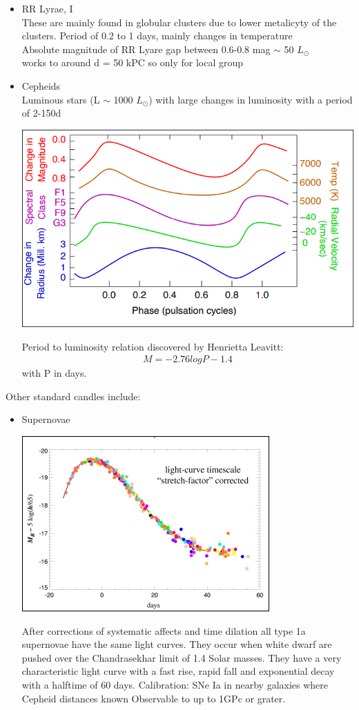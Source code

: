 \documentclass[11pt,a4paper]{article}
\begin{document}
\begin{itemize}
    \item RR Lyrae, I \\ 
        These are mainly found in globular clusters due to lower metalicyty of the clusters.
        Period of 0.2 to 1 days, mainly changes in temperature\\ 
        Absolute magnitude of RR Lyare gap between 0.6-0.8 mag $\sim$ 50 $L_\odot$ \\
        works to around d = 50 kPC so only for local group
    \item Cepheids \\ 
        Luminous stars (L $\sim$ 1000 $L_\odot$) with large changes in luminosity with a period of 2-150d
\begin{center}
    \includegraphics[width=0.5\linewidth]{screenshot_2024-01-23-113927.png}
\end{center}
    Period to luminosity relation discovered by Henrietta Leavitt: 
     \begin{align*}
       M = -2.76 log P - 1.4 
     \end{align*}
     with P in days.
\end{itemize}
Other standard candles include: 
\begin{itemize}
    \item Supernovae 
\begin{center}
    \includegraphics[width=0.5\linewidth]{screenshot_2024-01-23-114223.png}
\end{center}
After corrections of systematic affects and time dilation all type 1a supernovae have the same light curves.
They occur when white dwarf are pushed over the Chandrasekhar limit of 1.4 Solar masses.
They have a very characteristic light curve with a fast rise, rapid fall and exponential decay with a halftime of 60 days.
Calibration: SNe Ia in nearby galaxies where Cepheid distances known
Observable to up to 1GPc or grater.
\end{itemize}
\end{document}
